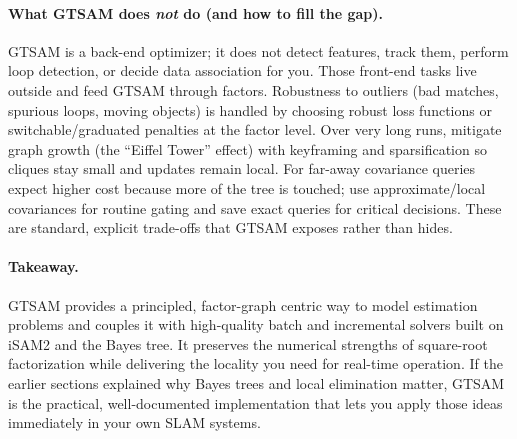 \paragraph{What GTSAM does \emph{not} do (and how to fill the gap).}
GTSAM is a back-end optimizer; it does not detect features, track them, perform loop detection, or decide data association for you. Those front-end tasks live outside and feed GTSAM through factors. Robustness to outliers (bad matches, spurious loops, moving objects) is handled by choosing robust loss functions or switchable/graduated penalties at the factor level. Over very long runs, mitigate graph growth (the “Eiffel Tower” effect) with keyframing and sparsification so cliques stay small and updates remain local. For far-away covariance queries expect higher cost because more of the tree is touched; use approximate/local covariances for routine gating and save exact queries for critical decisions. These are standard, explicit trade-offs that GTSAM exposes rather than hides. \cite{iSAM2_paper,Bayes_tree_for_SLAM_paper}

\paragraph{Takeaway.}
GTSAM provides a principled, factor-graph centric way to model estimation problems and couples it with high-quality batch and incremental solvers built on iSAM2 and the Bayes tree. It preserves the numerical strengths of square-root factorization while delivering the locality you need for real-time operation. If the earlier sections explained why Bayes trees and local elimination matter, GTSAM is the practical, well-documented implementation that lets you apply those ideas immediately in your own SLAM systems. \cite{GTSAM_handbook,iSAM2_paper,Bayes_tree_for_SLAM_paper}
